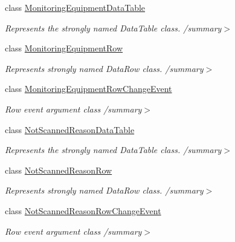 \begin{DoxyCompactItemize}
class \hyperlink{class_env_int_1_1_win32_1_1_field_tech_1_1_manager_1_1_data_sets_1_1_guide_ware_mobile_data_set_7131b02aa7df3a564ec0583e2a4bad1c}{Monitoring\+Equipment\+Data\+Table}
\begin{DoxyCompactList}\small\item\em Represents the strongly named Data\+Table class. /summary$>$ \end{DoxyCompactList}\item 
class \hyperlink{class_env_int_1_1_win32_1_1_field_tech_1_1_manager_1_1_data_sets_1_1_guide_ware_mobile_data_set_1_1_monitoring_equipment_row}{Monitoring\+Equipment\+Row}
\begin{DoxyCompactList}\small\item\em Represents strongly named Data\+Row class. /summary$>$ \end{DoxyCompactList}\item 
class \hyperlink{class_env_int_1_1_win32_1_1_field_tech_1_1_manager_1_1_data_sets_1_1_guide_ware_mobile_data_set_508b9e1e7fb778ecd4f9ec08c0203079}{Monitoring\+Equipment\+Row\+Change\+Event}
\begin{DoxyCompactList}\small\item\em Row event argument class /summary$>$ \end{DoxyCompactList}\item 
class \hyperlink{class_env_int_1_1_win32_1_1_field_tech_1_1_manager_1_1_data_sets_1_1_guide_ware_mobile_data_set_3a89f7a343b8f54d37f600360bb446ff}{Not\+Scanned\+Reason\+Data\+Table}
\begin{DoxyCompactList}\small\item\em Represents the strongly named Data\+Table class. /summary$>$ \end{DoxyCompactList}\item 
class \hyperlink{class_env_int_1_1_win32_1_1_field_tech_1_1_manager_1_1_data_sets_1_1_guide_ware_mobile_data_set_1_1_not_scanned_reason_row}{Not\+Scanned\+Reason\+Row}
\begin{DoxyCompactList}\small\item\em Represents strongly named Data\+Row class. /summary$>$ \end{DoxyCompactList}\item 
class \hyperlink{class_env_int_1_1_win32_1_1_field_tech_1_1_manager_1_1_data_sets_1_1_guide_ware_mobile_data_set_26a68af3739fcf7dfebacfa26943a678}{Not\+Scanned\+Reason\+Row\+Change\+Event}
\begin{DoxyCompactList}\small\item\em Row event argument class /summary$>$ \end{DoxyCompactList}\item 

\end{DoxyCompactItemize}
